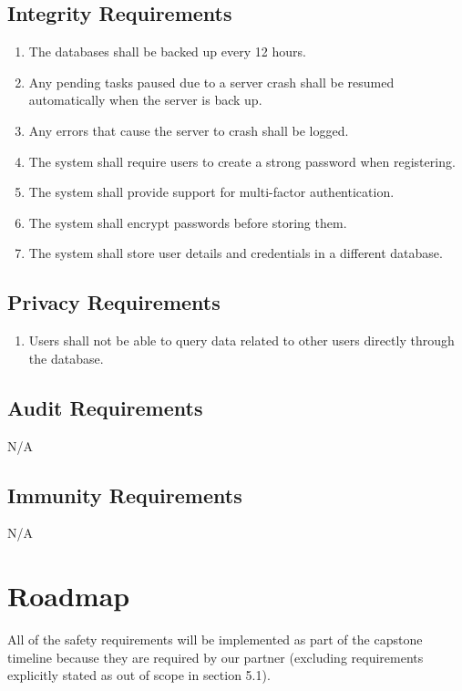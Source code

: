 \documentclass{article}
\begin{document}
\subsection{Integrity Requirements}
\begin{enumerate}[label = IR-\arabic*, left=\parindent, series=IR]
    \item The databases shall be backed up every 12 hours.
    \item Any pending tasks paused due to a server crash shall be resumed automatically when the server is back up.
    \item Any errors that cause the server to crash shall be logged.
    \item The system shall require users to create a strong password when registering.
    \item The system shall provide support for multi-factor authentication.
    \item The system shall encrypt passwords before storing them.
    \item The system shall store user details and credentials in a different database.
\end{enumerate}

\subsection{Privacy Requirements}
\begin{enumerate}[label = PR-\arabic*, left=\parindent, series=PR]
    \item Users shall not be able to query data related to other users directly through the database.
\end{enumerate}

\subsection{Audit Requirements}
N/A

\subsection{Immunity Requirements}
N/A


\section{Roadmap}

All of the safety requirements will be implemented as part of the capstone timeline because they are required by our partner (excluding requirements explicitly stated as out of scope in section 5.1).
\end{document}
